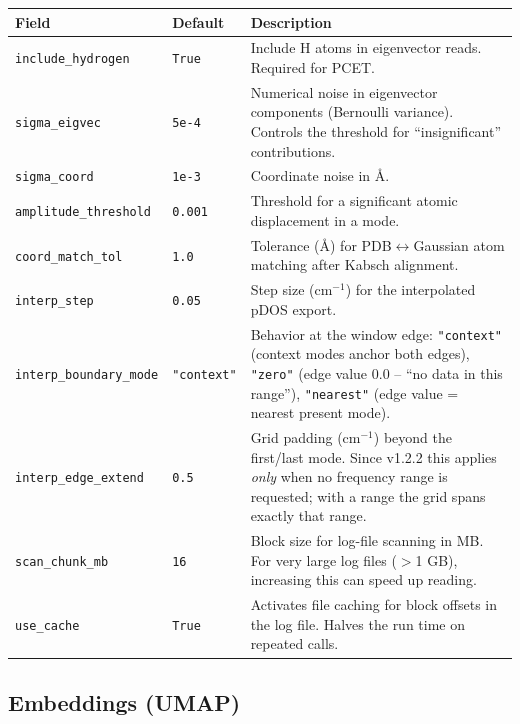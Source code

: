 \documentclass[11pt,a4paper,twoside]{article}
\theoremstyle{remark}
\begin{document}
\begin{longtable}{p{} p{} p{}}
\toprule
\textbf{Field} & \textbf{Default} & \textbf{Description} \\
\midrule
\endhead
\texttt{include\_hydrogen} & \texttt{True} & Include H atoms in
  eigenvector reads. Required for PCET. \\
\texttt{sigma\_eigvec}    & \texttt{5e-4}  & Numerical noise in
  eigenvector components (Bernoulli variance). Controls the
  threshold for ``insignificant'' contributions. \\
\texttt{sigma\_coord}     & \texttt{1e-3} & Coordinate noise in
  \AA{}. \\
\texttt{amplitude\_threshold} & \texttt{0.001} & Threshold for a
  significant atomic displacement in a mode. \\
\texttt{coord\_match\_tol} & \texttt{1.0}   & Tolerance (\AA{}) for
  PDB$\leftrightarrow$Gaussian atom matching after Kabsch alignment. \\
\texttt{interp\_step}     & \texttt{0.05}  & Step size (cm$^{-1}$)
  for the interpolated pDOS export. \\
\texttt{interp\_boundary\_mode} & \texttt{"context"} & Behavior at
  the window edge: \texttt{"context"} (context modes anchor both
  edges), \texttt{"zero"} (edge value $0.0$ -- ``no data in this
  range''), \texttt{"nearest"} (edge value = nearest present mode). \\
\texttt{interp\_edge\_extend} & \texttt{0.5} & Grid padding
  (cm$^{-1}$) beyond the first/last mode. Since v1.2.2 this applies
  \emph{only} when no frequency range is requested; with a range the
  grid spans exactly that range. \\
\texttt{scan\_chunk\_mb}  & \texttt{16}    & Block size for log-file
  scanning in MB. For very large log files ($>$1 GB), increasing
  this can speed up reading. \\
\texttt{use\_cache}       & \texttt{True}  & Activates file caching
  for block offsets in the log file. Halves the run time on
  repeated calls. \\
\bottomrule
\end{longtable}

\subsection{Embeddings (UMAP)}
\end{document}
